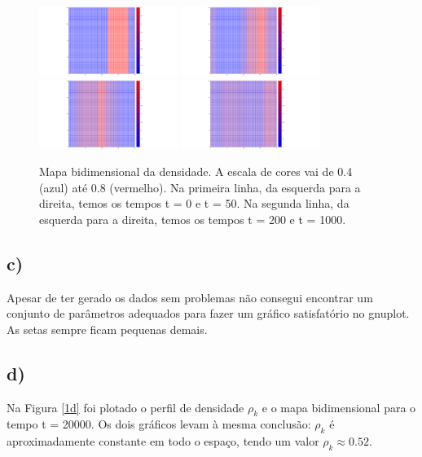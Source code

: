 \documentclass[a4wide]{report}
\begin{document}
\begin{figure}[!htb]
\centering
\includegraphics[width=0.4\textwidth]{mapa1.pdf}
\includegraphics[width=0.4\textwidth]{mapa50.pdf}
\includegraphics[width=0.4\textwidth]{mapa200.pdf}
\includegraphics[width=0.4\textwidth]{mapa1000.pdf}
\caption{Mapa bidimensional da densidade. A escala de cores vai de 0.4 (azul) até 0.8 (vermelho). Na primeira linha, da esquerda para a direita, temos os tempos t = 0 e t = 50. Na segunda linha, da esquerda para a direita, temos os tempos t = 200 e t = 1000.}
\label{1b}
\end{figure}

\subsection*{c) }
Apesar de ter gerado os dados sem problemas não consegui encontrar um conjunto de parâmetros adequados para fazer um gráfico satisfatório no gnuplot. As setas sempre ficam pequenas demais. 


\subsection*{d)	}

Na Figura \ref{1d} foi plotado o perfil de densidade $\rho_k$ e o mapa bidimensional para o tempo t = 20000. Os dois gráficos levam à mesma conclusão: $\rho_k$ é aproximadamente constante em todo o espaço, tendo um valor $\rho_k \approx 0.52$.
\end{document}
